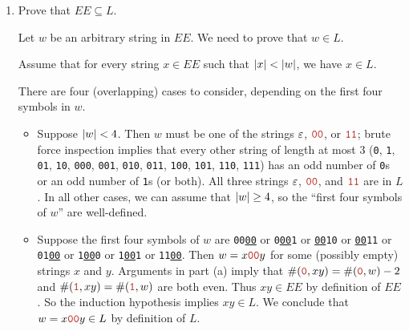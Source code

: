 \documentclass[11pt]{article}
\def\Sym#1{\texttt{\color{BrickRed}#1}}
\begin{document}
\begin{enumerate}
\begin{enumerate}
\begin{Solution}
\begin{itemize}
\item
Finally, suppose $w = x\Sym{11}y$ for some strings $x$ and $y$ such that $xy\in L$.  Then
\begin{align*}
	\#(\Sym0, w) 
	&=
	\#(\Sym0, x\Sym{11}y) \\
	&=
	\#(\Sym0, x) + \#(\Sym0, \Sym{11}) + \#(\Sym0, y) \\
	&=
	\#(\Sym0, x) + \#(\Sym0, y) \\
	&=
	\#(\Sym0, xy)
\end{align*}
The induction hypothesis implies $\#(\Sym0, w) = \#(\Sym0, xy)$ is even.
\end{itemize}
In all cases, we have shown that $\#(\Sym0, w)$ is even.  Symmetric arguments imply that $\#(\Sym1, w)$ is even.  We conclude that $w\in EE$.
\end{Solution}
\unskip
\begin{rubric}
5 points: standard induction rubric (scaled).  Yes, this is enough detail for $\#(\Sym1, w)$.  If explicit proofs are given for both $\#(\Sym0, w)$ and $\#(\Sym1, w)$, grade them independently, each for 2\textonehalf\ points.  
\end{rubric}

\medskip
\item Prove that $EE \subseteq L$.

\begin{Solution}\parindent 0pt
Let $w$ be an arbitrary string in $EE$.  We need to prove that $w\in L$.

Assume that for every string $x\in EE$ such that $\mathopen| x \mathclose|<\mathopen| w \mathclose|$, we have $x\in L$.

There are four (overlapping) cases to consider, depending on the first four symbols in $w$.
\begin{itemize}
\item
Suppose $\mathopen| w \mathclose| < 4$.  Then $w$ must be one of the strings $\varepsilon$, $\Sym{00}$, or $\Sym{11}$; brute force inspection implies that every other string of length at most 3 (\Sym0, \Sym1, \Sym{01}, \Sym{10}, \Sym{000}, \Sym{001}, \Sym{010}, \Sym{011}, \Sym{100}, \Sym{101}, \Sym{110}, \Sym{111}) has an odd number of \Sym0s or an odd number of \Sym1s (or both).  All three strings $\varepsilon$, $\Sym{00}$, and $\Sym{11}$ are in $L$.  In all other cases, we can assume that $\mathopen| w \mathclose| \ge 4$, so the “first four symbols of $w$” are well-defined.

\item
Suppose the first four symbols of $w$ are \Sym{00\underline{00}} or \Sym{0\underline{00}1} or \Sym{\underline{00}10} or \Sym{\underline{00}11} or \Sym{01\underline{00}} or \Sym{1\underline{00}0} or \Sym{1\underline{00}1} or \Sym{11\underline{00}}.  Then $w = x\Sym{00}y$ for some (possibly empty) strings $x$ and $y$.  Arguments in part (a) imply that $\#(\Sym0, xy) = \#(\Sym0, w) - 2$ and  $\#(\Sym1, xy) = \#(\Sym1, w)$ are both even.  Thus $xy\in EE$ by definition of $EE$.  So the induction hypothesis implies $xy\in L$.  We conclude that $w = x\Sym{00}y \in L$ by definition of $L$.


\end{itemize}
\end{Solution}
\end{enumerate}
\end{enumerate}
\end{document}
